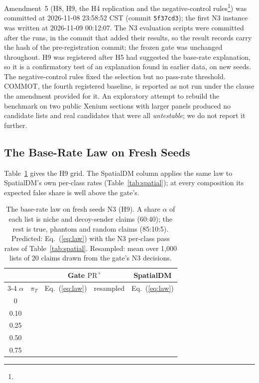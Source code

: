 \documentclass[letterpaper]{article} %
\begin{document}
Amendment~5 (H8, H9, the H4 replication and the negative-control rules\footnote{\repoNegPrespec}) was committed at
2026-11-08 23:58:52 CST (commit \texttt{5f37cd3}); the first N3 instance was written at 2026-11-09 00:12:07. The N3
evaluation scripts were committed after the runs, in the commit that added their results, so the result records carry
the hash of the pre-registration commit; the frozen gate was unchanged throughout. H9 was registered after H5 had
suggested the base-rate explanation, so it is a confirmatory test of an explanation found in earlier data, on new seeds.
The negative-control rules fixed the selection but no pass-rate threshold. COMMOT, the fourth registered baseline, is
reported as not run under the clause the amendment provided for it. An exploratory attempt to rebuild the benchmark on two
public Xenium sections with larger panels produced no candidate lists and real candidates that were all
\emph{untestable}; we do not report it further.

\subsection{The Base-Rate Law on Fresh Seeds}
Table~\ref{tab:base} gives the H9 grid. The SpatialDM column applies the same law to SpatialDM's own per-class rates
(Table~\ref{tab:spatial}); at every composition its expected false share is well above the gate's.

\begin{table}[t]
\centering
\small
\setlength{\tabcolsep}{4pt}
\begin{tabular}{@{}ccccc@{}}
\toprule
 & & \multicolumn{2}{c}{Gate $\mathrm{PR}^{+}$} & SpatialDM \\
\cmidrule(lr){3-4}
$\alpha$ & $\pi_T$ & Eq.~(\ref{eq:law}) & resampled & Eq.~(\ref{eq:law}) \\
\midrule
0    & \brAZeroPiTrue{} & \brAZeroPred{} & \brAZeroEmp{} & \brAZeroSdm{} \\
0.10 & \brATenPiTrue{} & \brATenPred{} & \brATenEmp{} & \brATenSdm{} \\
0.25 & \brATwentyFivePiTrue{} & \brATwentyFivePred{} & \brATwentyFiveEmp{} & \brATwentyFiveSdm{} \\
0.50 & \brAFiftyPiTrue{} & \brAFiftyPred{} & \brAFiftyEmp{} & \brAFiftySdm{} \\
0.75 & \brASeventyFivePiTrue{} & \brASeventyFivePred{} & \brASeventyFiveEmp{} & \brASeventyFiveSdm{} \\
\bottomrule
\end{tabular}
\caption{The base-rate law on fresh seeds N3 (H9). A share $\alpha$ of each list is niche and decoy-sender claims
(60:40); the rest is true, phantom and random claims (85:10:5). Predicted: Eq.~(\ref{eq:law}) with the N3 per-class pass
rates of Table~\ref{tab:spatial}. Resampled: mean over 1,000 lists of 20 claims drawn from the gate's N3 decisions.}
\label{tab:base}
\end{table}
\end{document}
